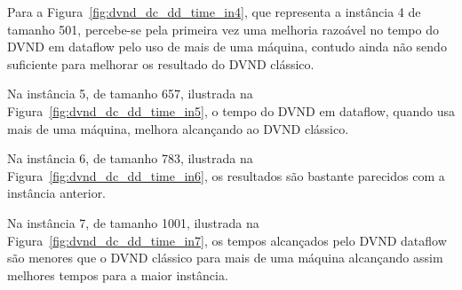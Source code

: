 Para a Figura~\ref{fig:dvnd_dc_dd_time_in4}, que representa a instância 4 de tamanho 501, percebe-se pela primeira vez uma melhoria razoável no tempo do DVND em dataflow pelo uso de mais de uma máquina, contudo ainda não sendo suficiente para melhorar os resultado do DVND clássico.


Na instância 5, de tamanho 657, ilustrada na Figura~\ref{fig:dvnd_dc_dd_time_in5}, o tempo do DVND em dataflow, quando usa mais de uma máquina, melhora alcançando ao DVND clássico.


Na instância 6, de tamanho 783, ilustrada na Figura~\ref{fig:dvnd_dc_dd_time_in6}, os resultados são bastante parecidos com a instância anterior.


Na instância 7, de tamanho 1001, ilustrada na Figura~\ref{fig:dvnd_dc_dd_time_in7}, os tempos alcançados pelo DVND dataflow são menores que o DVND clássico para mais de uma máquina alcançando assim melhores tempos para a maior instância.

